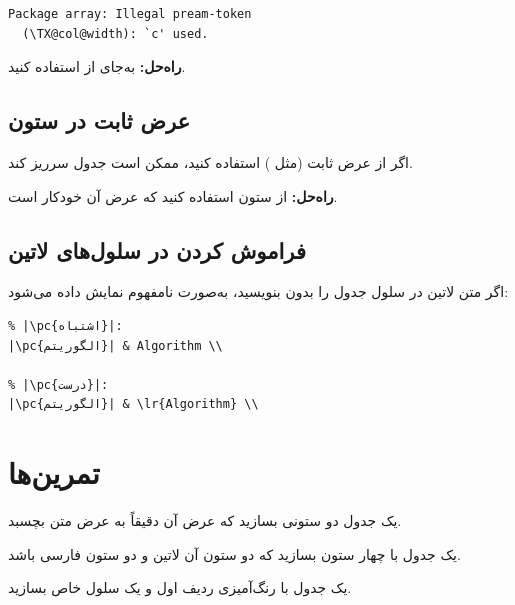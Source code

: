 \begin{latin}
\begin{verbatim}
Package array: Illegal pream-token
  (\TX@col@width): `c' used.
\end{verbatim}
\end{latin}

\textbf{راه‌حل:} به‌جای  از
 استفاده کنید.

\subsection{عرض ثابت در ستون}
\label{sec:tables-mistake-fixed-width}

اگر از عرض ثابت (مثل ) استفاده
کنید، ممکن است جدول سرریز کند.

\textbf{راه‌حل:} از ستون  استفاده کنید
که عرض آن خودکار است.

\subsection{فراموش کردن  در سلول‌های لاتین}
\label{sec:tables-mistake-lr}

اگر متن لاتین در سلول جدول را بدون 
بنویسید، به‌صورت نامفهوم نمایش داده می‌شود:

\begin{latin}
\begin{verbatim}
% |\pc{اشتباه}|:
|\pc{الگوریتم}| & Algorithm \\

% |\pc{درست}|:
|\pc{الگوریتم}| & \lr{Algorithm} \\
\end{verbatim}
\end{latin}

\section{تمرین‌ها}
\label{sec:tables-exercises}

\begin{exercise}
    یک جدول دو ستونی بسازید که عرض آن دقیقاً
    به عرض متن بچسبد.
    \label{exc:tables-basic}
\end{exercise}

\begin{exercise}
    یک جدول با چهار ستون بسازید که دو ستون
    آن لاتین و دو ستون فارسی باشد.
    \label{exc:tables-mixed}
\end{exercise}

\begin{exercise}
    یک جدول با رنگ‌آمیزی ردیف اول و یک سلول
    خاص بسازید.
    \label{exc:tables-color}
\end{exercise}

